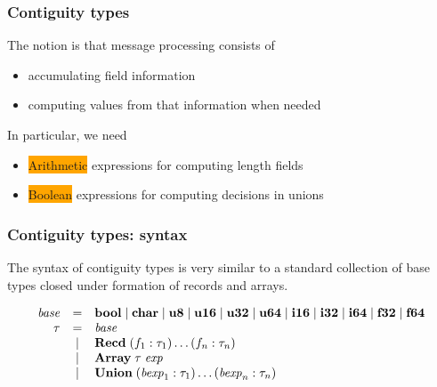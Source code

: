\documentclass{beamer}
\newcommand{\kemph}[1]{\colorbox{orange}{#1}}
\newcommand{\konst}[1]{\ensuremath{\mbox{\bf{#1}}}}
\begin{document}
\begin{frame}[fragile]\frametitle{Contiguity types}

  The notion is that message processing consists of

\begin{itemize}
\item accumulating field information
\item computing values from that information when needed
\end{itemize}

In particular, we need

\begin{itemize}
\item \kemph{Arithmetic} expressions for computing length fields
\item \kemph{Boolean} expressions for computing decisions in unions
\end{itemize}

\end{frame}

\begin{frame}[fragile]\frametitle{Contiguity types: syntax}

The syntax of contiguity types is very similar to a standard
collection of base types closed under formation of records and arrays.

\[
\begin{array}{rcl}
 \mathit{base} & = & \konst{bool} \mid \konst{char} \mid \konst{u8} \mid
 \konst{u16} \mid \konst{u32} \mid \konst{u64}  \mid \konst{i16} \mid
 \konst{i32} \mid \konst{i64} \mid \konst{f32} \mid \konst{f64} \\
 \tau & = & \mathit{base} \\
      & \mid & \konst{Recd}\; (f_1 : \tau_1) \ldots (f_n : \tau_n) \\
      & \mid & \konst{Array}\; \tau \; \mathit{exp} \\
      & \mid & \konst{Union}\; (\mathit{bexp}_1 : \tau_1) \ldots (\mathit{bexp}_n : \tau_n)
\end{array}
\]
\end{frame}
\end{document}
